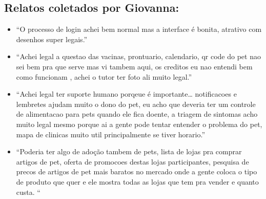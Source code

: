 \subsection{Relatos coletados por Giovanna:}
\begin{itemize}
\item “O processo de login achei bem normal  mas a interface é bonita, atrativo com desenhos super legais.”

\item “Achei legal a questao das vacinas, prontuario, calendario, qr code do pet nao sei bem pra que serve
mas vi tambem aqui, os creditos eu nao entendi bem como funcionam ,
achei o tutor ter foto ali muito legal.”

\item “Achei legal ter suporte humano porqeue é importante…
 notificacoes e lembretes ajudam muito o dono do pet,
eu acho que deveria ter um controle de alimentacao para pets quando ele fica doente,
a triagem de sintomas acho muito legal mesmo porque ai a gente pode tentar entender o problema do pet, mapa de clinicas muito util principalmente se tiver horario.”

\item “Poderia ter algo de adoção tambem de pets,
lista de lojas pra comprar artigos de pet, oferta de promocoes destas lojas participantes,
 pesquisa de precos de artigos de pet mais baratos no mercado onde a gente coloca o tipo de produto que quer e ele mostra todas as lojas que tem pra vender e quanto custa. “

 \end{itemize}


